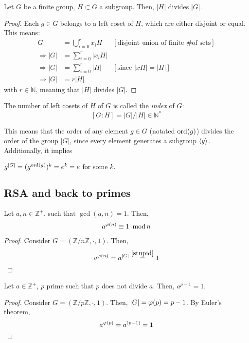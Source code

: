 \begin{theorem}
Let $G$ be a finite group, $H \subset G$ a subgroup. Then, $|H|$ divides $|G|$.
\end{theorem}
\begin{proof}
  Each $g \in G$ belongs to a left coset of $H$, which are either disjoint or equal. This means:
  \begin{align*}
    G &= \bigcup_{i = 0}^{r}x_iH &[\text{disjoint union of finite \# of sets}] \\
    \Rightarrow |G| &= \sum_{i = 0}^r |x_iH| &\\
    \Rightarrow |G| &= \sum_{i = 0}^r |H| &[\text{since } |xH| = |H|] \\
    \Rightarrow |G| &= r|H| &
  \end{align*}
  with $r \in \mathbb{N}$, meaning that $|H|$ divides $|G|$. 
\end{proof}

\begin{definition}
  The number of left cosets of $H$ of $G$ is called the \emph{index} of $G$: 
  \[
    [G : H] = |G|/|H| \in \mathbb{N}^*
  \]
\end{definition}

This means that the order of any element $g \in G$ (notated $\operatorname{ord}(g)$) divides the order of the group $|G|$, since every element generates a subgroup $\langle g \rangle$. Additionally, it implies 

\begin{corollary}\label{stupid}
  $g^{|G|} = (g^{\operatorname{ord}(g)})^{k} = e^k = e$ for some $k$.
\end{corollary}

\subsection{RSA and back to primes}

\begin{theorem}
  Let $a, n \in \mathbb{Z}^+$. such that $\gcd(a, n) = 1$. Then, \[ a^{\varphi(n)} \equiv 1 \ \operatorname{mod} n\]
\end{theorem}
\begin{proof}
  Consider $G = (\mathbb{Z}/n\mathbb{Z}, \cdot, 1)$. Then, 
  \[
    a^{\varphi(n)} = a^{|G|} \stackrel{\ref{stupid}}{=} 1
  \]
\end{proof}

\begin{theorem}
  Let $a \in \mathbb{Z}^+$, $p$ prime such that $p$ does not divide $a$. Then, $a^{p - 1} = 1$. 
\end{theorem}
\begin{proof}
  Consider $G = (\mathbb{Z}/p\mathbb{Z}, \cdot, 1)$. Then, $|G| = \varphi(p) = p - 1$. By Euler's theorem, \[a^{\varphi(p)} = a^{(p - 1)} = 1\]
\end{proof}

